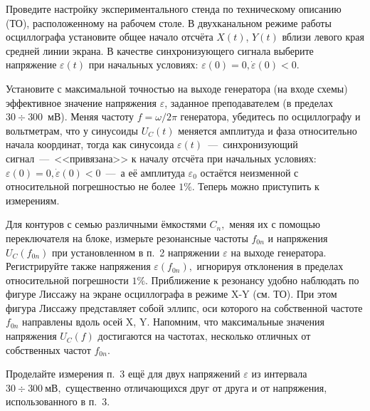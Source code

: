 \begin{lab:task}

\item Проведите настройку экспериментального стенда по техническому описанию
(ТО), расположенному на рабочем столе. В двухканальном режиме работы
осциллографа установите общее начало отсчёта $X(t)$, $Y(t)$ вблизи левого края
средней линии экрана. В качестве синхронизующего сигнала выберите напряжение
$\varepsilon(t)$ при начальных условиях: $\varepsilon(0)=0,
\dot{\varepsilon}(0)<0.$

    \item Установите с максимальной точностью на выходе генератора (на входе
схемы) эффективное значение напряжения $\varepsilon$, заданное преподавателем (в
пределах $30\div300$~мВ). Меняя частоту $f=\omega/2\pi$ генератора, убедитесь по
осциллографу и вольтметрам, что у синусоиды $U_C(t)$ меняется амплитуда и фаза
относительно начала координат, тогда как синусоида
$\varepsilon(t)$~---~синхронизующий сигнал~---~<<привязана>> к началу отсчёта
при начальных условиях: $\varepsilon(0)=0, \dot{\varepsilon}(0)<0$~---~а её
амплитуда $\varepsilon_0$ остаётся неизменной с относительной погрешностью не
более $1\%$. Теперь можно приступить к измерениям.

    \item Для контуров с семью различными ёмкостями $C_n,$ меняя их с помощью
переключателя на блоке, измерьте резонансные частоты $f_{0n}$ и напряжения
$U_C(f_{0n})$ при установленном в п.~2 напряжении $\varepsilon$ на выходе
генератора. Регистрируйте также напряжения $\varepsilon(f_{0n}),$ игнорируя
отклонения в пределах относительной погрешности $1\%$. Приближение к резонансу
удобно наблюдать по фигуре Лиссажу на экране осциллографа в режиме X-Y (см. ТО).
При этом фигура Лиссажу представляет собой эллипс, оси которого на собственной
частоте $f_{0n}$ направлены вдоль осей X, Y. Напомним, что максимальные значения
напряжения $U_C(f)$ достигаются на частотах, несколько отличных от собственных
частот $f_{0n}.$

    \item * Проделайте измерения п.~3 ещё
для двух напряжений $\varepsilon$ из интервала $30\div 300~мВ,$ существенно
отличающихся друг от друга и от напряжения, использованного в п.~3.


\end{lab:task}
